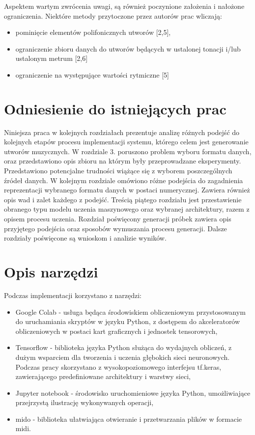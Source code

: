 {{    Aspektem wartym zwrócenia uwagi, są również poczynione założenia i nałożone
    ograniczenia. Niektóre metody przytoczone przez autorów prac wliczają:
    \begin{itemize}
      \item pominięcie elementów polifonicznych utworów [2,5],
      \item ograniczenie zbioru danych do utworów będących w 
      ustalonej tonacji i/lub ustalonym metrum [2,6]
      \item ograniczenie na występujące wartości rytmiczne [5] 
    \end{itemize}
  }

  \section{Odniesienie do istniejących prac}
  {
    Niniejsza praca w kolejnych rozdziałach prezentuje analizę różnych podejść do kolejnych etapów
    procesu implementacji systemu, którego celem jest generowanie utworów muzycznych. 
    W rozdziale 3. poruszono problem wyboru formatu danych, oraz przedstawiono opis zbioru na którym
    były przeprowadzane eksperymenty. Przedstawiono potencjalne trudności wiążące się z wyborem
    poszczególnych źródeł danych.
    W kolejnym rozdziale omówiono różne podejścia do zagadnienia reprezentacji wybranego formatu 
    danych w postaci numerycznej. Zawiera również opis wad i zalet każdego z podejść.
    Treścią piątego rozdziału jest przestawienie obranego typu modelu uczenia maszynowego oraz 
    wybranej architektury, razem z opisem procesu uczenia.
    Rozdział poświęcony generacji próbek zawiera opis przyjętego podejścia oraz sposobów 
    wymuszania procesu generacji.
    Dalsze rozdziały poświęcone są wnioskom i analizie wyników.
  }

  \section{Opis narzędzi}
  {
    Podczas implementacji korzystano z narzędzi:
    \begin{itemize}
      \item Google Colab - usługa będąca środowiskiem obliczeniowym przystosowanym 
      do uruchamiania skryptów w języku Python, z dostępem do akceleratorów obliczeniowych
      w postaci kart graficznych i jednostek tensorowych,
      \item Tensorflow - biblioteka języka Python służąca do wydajnych obliczeń, z dużym wsparciem 
      dla tworzenia i uczenia głębokich sieci neuronowych. Podczas pracy skorzystano z 
      wysokopoziomowego interfejsu tf.keras, zawierającego predefiniowane architektury i warstwy sieci,
      \item Jupyter notebook - środowisko uruchomieniowe języka Python, umożliwiające przejrzystą
      ilustrację wykonywanych operacji,
      \item mido - biblioteka ułatwiająca otwieranie i przetwarzania plików w formacie midi.
    \end{itemize}
  }
}